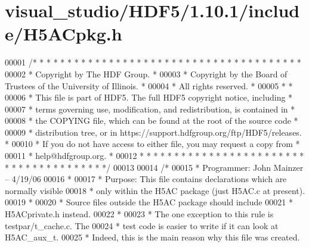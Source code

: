 \hypertarget{visual__studio_2_h_d_f5_21_810_81_2include_2_h5_a_cpkg_8h_source}{}\section{visual\+\_\+studio/\+H\+D\+F5/1.10.1/include/\+H5\+A\+Cpkg.h}
\label{visual__studio_2_h_d_f5_21_810_81_2include_2_h5_a_cpkg_8h_source}

\begin{DoxyCode}
00001 \textcolor{comment}{/* * * * * * * * * * * * * * * * * * * * * * * * * * * * * * * * * * * * * * *}
00002 \textcolor{comment}{ * Copyright by The HDF Group.                                               *}
00003 \textcolor{comment}{ * Copyright by the Board of Trustees of the University of Illinois.         *}
00004 \textcolor{comment}{ * All rights reserved.                                                      *}
00005 \textcolor{comment}{ *                                                                           *}
00006 \textcolor{comment}{ * This file is part of HDF5.  The full HDF5 copyright notice, including     *}
00007 \textcolor{comment}{ * terms governing use, modification, and redistribution, is contained in    *}
00008 \textcolor{comment}{ * the COPYING file, which can be found at the root of the source code       *}
00009 \textcolor{comment}{ * distribution tree, or in https://support.hdfgroup.org/ftp/HDF5/releases.  *}
00010 \textcolor{comment}{ * If you do not have access to either file, you may request a copy from     *}
00011 \textcolor{comment}{ * help@hdfgroup.org.                                                        *}
00012 \textcolor{comment}{ * * * * * * * * * * * * * * * * * * * * * * * * * * * * * * * * * * * * * * */}
00013 
00014 \textcolor{comment}{/*}
00015 \textcolor{comment}{ * Programmer: John Mainzer -- 4/19/06}
00016 \textcolor{comment}{ *}
00017 \textcolor{comment}{ * Purpose:     This file contains declarations which are normally visible}
00018 \textcolor{comment}{ *              only within the H5AC package (just H5AC.c at present).}
00019 \textcolor{comment}{ *}
00020 \textcolor{comment}{ *      Source files outside the H5AC package should include}
00021 \textcolor{comment}{ *      H5ACprivate.h instead.}
00022 \textcolor{comment}{ *}
00023 \textcolor{comment}{ *      The one exception to this rule is testpar/t\_cache.c.  The}
00024 \textcolor{comment}{ *      test code is easier to write if it can look at H5AC\_aux\_t.}
00025 \textcolor{comment}{ *      Indeed, this is the main reason why this file was created.}

\end{DoxyCode}
